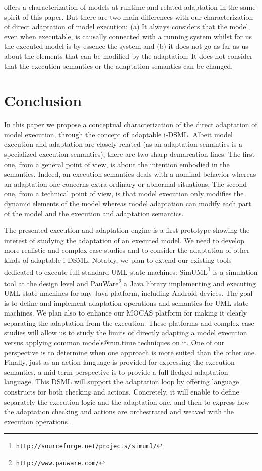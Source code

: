 \documentclass[english, 10pt]{llncs}
\begin{document}
\cite{lehmann10} offers a characterization of models at
runtime and related adaptation in the same spirit of this paper. But
there are two main differences with our characterization of direct
adaptation of model execution: (a) It always considers that the model,
even when executable, is causally connected with a running system
whilst for us the executed model is by essence the system and (b) it
does not go as far as us about the elements that can be modified by
the adaptation: It does not consider that the execution semantics or
the adaptation semantics can be changed.

\section{Conclusion}

In this paper we propose a conceptual characterization of the direct
adaptation of model execution, through the concept of adaptable
i-DSML. Albeit model execution and adaptation are closely related (as
an adaptation semantics is a specialized execution semantics), there
are two sharp demarcation lines. The first one, from a general point
of view, is about the intention embodied in the semantics. Indeed, an
execution semantics deals with a nominal behavior whereas an
adaptation one concerns extra-ordinary or abnormal situations. The
second one, from a technical point of view, is that model execution
only modifies the dynamic elements of the model whereas model
adaptation can modify each part of the model and the execution and
adaptation semantics.

The presented execution and adaptation engine is a first prototype
showing the interest of studying the adaptation of an executed model.
We need to develop more realistic and complex case studies and to
consider the adaptation of other kinds of adaptable i-DSML. Notably,
we plan to extend our existing tools dedicated to execute full
standard UML state machines:
SimUML\footnote{\texttt{http://sourceforge.net/projects/simuml/}} is a
simulation tool at the design level and
PauWare\footnote{\texttt{http://www.pauware.com/}} a Java library
implementing and executing UML state machines for any Java platform,
including Android devices. The goal is to define and implement
adaptation operations and semantics for UML state machines. We plan
also to enhance our MOCAS platform for making it clearly separating
the adaptation from the execution. These platforms and complex case
studies will allow us to study the limits of directly adapting a model
execution versus applying common models@run.time techniques on it. One
of our perspective is to determine when one approach is more suited
than the other one. Finally, just as an action language is provided
for expressing the execution semantics, a mid-term perspective is to
provide a full-fledged adaptation language. This DSML will support the
adaptation loop by offering language constructs for both checking and
actions. Concretely, it will enable to define separately the execution
logic and the adaptation one, and then to express how the adaptation
checking and actions are orchestrated and weaved with the execution
operations.




\end{document}
